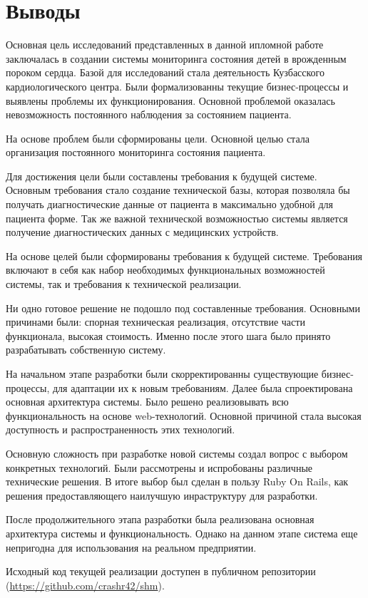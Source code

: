 \newpage
\section*{Выводы}
Основная цель исследований представленных в данной ипломной работе заключалась в
создании системы мониторинга состояния детей в врожденным пороком сердца.
Базой для исследований стала деятельность Кузбасского кардиологического центра.
Были формализованны текущие бизнес-процессы и выявлены проблемы их
функционирования. Основной проблемой оказалась невозможность постоянного
наблюдения за состоянием пациента.

На основе проблем были сформированы цели. Основной целью стала организация
постоянного мониторинга состояния пациента. 

Для достижения цели были составлены требования к будущей системе. Основным требования стало
создание технической базы, которая позволяла бы получать диагностические данные
от пациента в максимально удобной для пациента форме. Так же важной технической
возможностью системы является получение диагностических данных с медицинских
устройств.

На основе целей были сформированы требования к будущей системе. Требования
включают в себя как набор необходимых функциональных возможностей системы, так и
требования к технической реализации.

Ни одно готовое решение не подошло под составленные требования. Основными
причинами были: спорная техническая реализация, отсутствие части функционала,
высокая стоимость. Именно после этого шага было принято разрабатывать
собственную систему.

На начальном этапе разработки были скорректированны существующие
бизнес-процессы, для адаптации их к новым требованиям. Далее была спроектирована
основная архитектура системы. Было решено реализовывать всю функциональность на
основе web-технологий. Основной причиной стала высокая доступность и
распространенность этих технологий.

Основную сложность при разработке новой системы создал вопрос с выбором
конкретных технологий. Были рассмотрены и испробованы различные технические
решения. В итоге выбор был сделан в пользу Ruby On Rails, как решения
предоставляющего наилучшую инраструктуру для разработки.

После продолжительного этапа разработки была реализована основная архитектура
системы и функциональность. Однако на данном этапе система еще непригодна для
использования на реальном предприятии.

Исходный код текущей реализации доступен в публичном репозитории
(\url{https://github.com/crashr42/shm}).
